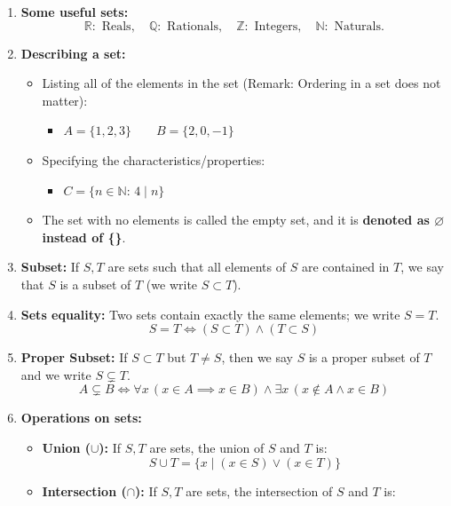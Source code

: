 \begin{enumerate}
    \item \textbf{Some useful sets:} 
    \[
        \mathbb{R}: \text{ Reals},\quad \mathbb{Q}: \text{ Rationals},\quad \mathbb{Z}: \text{ Integers},\quad \mathbb{N}: \text{ Naturals}.
    \]
    \item \textbf{Describing a set:}
        \begin{itemize}
            \item Listing all of the elements in the set (Remark: Ordering in a set does not matter):
            \begin{itemize}
                \item \(A = \{1, 2, 3\} \qquad B = \{2, 0, -1\}\) 
            \end{itemize}
            \item Specifying the characteristics/properties:
            \begin{itemize}
                \item \(C = \{ n \in \mathbb{N} :\, 4 \mid n \}\)
            \end{itemize}
            \item The set with no elements is called the empty set, and it is \textbf{denoted as \(\varnothing\) instead of \{\}}.
        \end{itemize}
    \item \textbf{Subset:} If \(S, T\) are sets such that all elements of \(S\) are contained in \(T\), we say that \(S\) is a subset of \(T\) (we write \(S \subset T\)).
    \item \textbf{Sets equality:} Two sets contain exactly the same elements; we write \(S = T\). 
        \[ S = T \Leftrightarrow (S \subset T) \land (T \subset S)\]
    \item \textbf{Proper Subset:} If \(S \subset T\) but \(T \neq S\), then we say \(S\) is a proper subset of \(T\) and we write \(S \subsetneq T\).
        \[A \subsetneq B \Leftrightarrow \forall x \, (x \in A \implies x \in B) \land \exists x \, (x \notin A \land x \in B)\]
    \item \textbf{Operations on sets:} 
        \begin{itemize}
            \item \textbf{Union (\(\cup\)):} If \(S, T\) are sets, the union of \(S\) and \(T\) is:
                \[S \cup T = \{x \mid (x \in S) \lor (x \in T)\}\]
            \item \textbf{Intersection (\(\cap\)):} If \(S, T\) are sets, the intersection of \(S\) and \(T\) is:

\end{itemize}
\end{enumerate}
